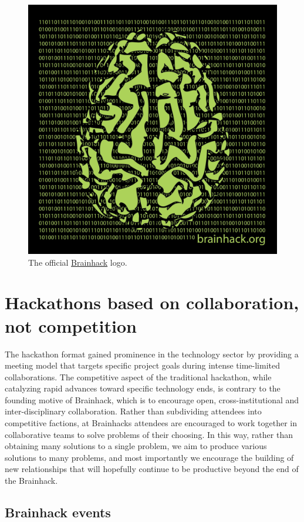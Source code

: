 \documentclass[11pt]{bmc_article_s50}
\begin{document}
\begin{figure}[ht!]
\begin{center}
\includegraphics[width=.5\textwidth]{brainhack_greenbrain}

 \caption{The official \href{http://www.brainhack.org}{Brainhack} logo.}
 \end{center}
\end{figure}

\section{Hackathons based on collaboration, not competition}\label{hackathons-based-on-collaboration-not-competition}

The hackathon format gained prominence in the technology sector by providing a meeting model that targets specific project goals during intense time-limited collaborations. The competitive aspect of the traditional hackathon, while catalyzing rapid advances toward specific technology ends, is contrary to the founding motive of Brainhack, which is to encourage open, cross-institutional and inter-disciplinary collaboration. Rather than subdividing attendees into competitive factions, at Brainhacks attendees are encouraged to work together in collaborative teams to solve problems of their choosing. In this way,  rather than obtaining many solutions to a single problem, we aim to produce various solutions to many problems,  and most importantly we encourage the building of new relationships that will hopefully continue to be productive beyond the end of the Brainhack.

\subsection{Brainhack events}
\end{document}
